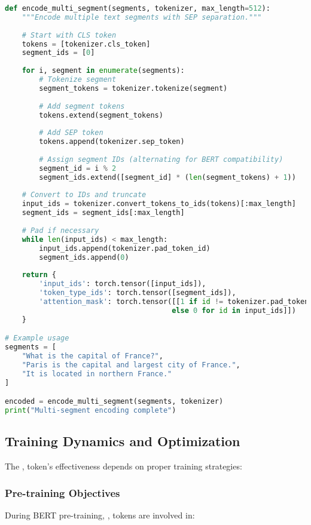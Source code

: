 \begin{example}
\begin{lstlisting}[language=Python]
def encode_multi_segment(segments, tokenizer, max_length=512):
    """Encode multiple text segments with SEP separation."""
    
    # Start with CLS token
    tokens = [tokenizer.cls_token]
    segment_ids = [0]
    
    for i, segment in enumerate(segments):
        # Tokenize segment
        segment_tokens = tokenizer.tokenize(segment)
        
        # Add segment tokens
        tokens.extend(segment_tokens)
        
        # Add SEP token
        tokens.append(tokenizer.sep_token)
        
        # Assign segment IDs (alternating for BERT compatibility)
        segment_id = i % 2
        segment_ids.extend([segment_id] * (len(segment_tokens) + 1))
    
    # Convert to IDs and truncate
    input_ids = tokenizer.convert_tokens_to_ids(tokens)[:max_length]
    segment_ids = segment_ids[:max_length]
    
    # Pad if necessary
    while len(input_ids) < max_length:
        input_ids.append(tokenizer.pad_token_id)
        segment_ids.append(0)
    
    return {
        'input_ids': torch.tensor([input_ids]),
        'token_type_ids': torch.tensor([segment_ids]),
        'attention_mask': torch.tensor([[1 if id != tokenizer.pad_token_id 
                                       else 0 for id in input_ids]])
    }

# Example usage
segments = [
    "What is the capital of France?",
    "Paris is the capital and largest city of France.",
    "It is located in northern France."
]

encoded = encode_multi_segment(segments, tokenizer)
print("Multi-segment encoding complete")
\end{lstlisting}
\end{example}

\subsection{Training Dynamics and Optimization}

The \sep{} token's effectiveness depends on proper training strategies:

\subsubsection{Pre-training Objectives}
During BERT pre-training, \sep{} tokens are involved in:

